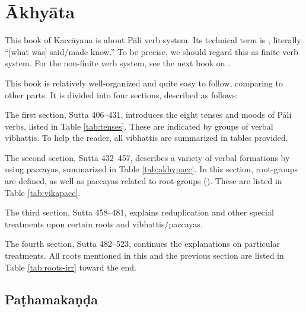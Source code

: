 \chapter{Ākhyāta}

This book of Kaccāyana is about Pāli verb system. Its technical term is , literally ``[what was] said/made know.'' To be precise, we should regard this as finite verb system. For the non-finite verb system, see the next book on .

This book is relatively well-organized and quite easy to follow, comparing to other parts. It is divided into four sections, described as follows:

The first section, Sutta 406--431, introduces the eight tenses and moods of Pāli verbs, listed in Table \ref{tab:tenses}. These are indicated by groups of verbal vibhattis. To help the reader, all vibhattis are summarized in tables provided.

The second section, Sutta 432--457, describes a variety of verbal formations by using paccayas, summarized in Table \ref{tab:akhypacc}. In this section, root-groups are defined, as well as paccayas related to root-groups (). These are listed in Table \ref{tab:vikapacc}.

The third section, Sutta 458--481, explains reduplication and other special treatments upon certain roots and vibhattis/paccayas.

The fourth section, Sutta 482--523, continues the explanations on particular treatments. All roots mentioned in this and the previous section are listed in Table \ref{tab:roots-irr} toward the end.

\section{Paṭhamakaṇḍa}
\raggedbottom

